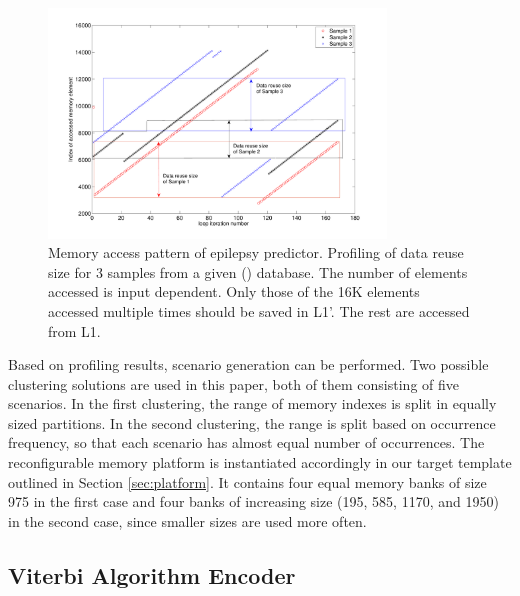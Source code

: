 \begin{figure}[!t]
\centering
\includegraphics[width=0.8\textwidth]{A/eegprof_v1-eps-converted-to.pdf}
\caption{Memory access pattern of epilepsy predictor. Profiling of data reuse size for 3 samples from a given (\cite{Iasemidis2005}) database. The number of elements accessed is input dependent. Only those of the 16K elements accessed multiple times should be saved in L1'. The rest are accessed from L1.}
\label{fig:eegprof}
\end{figure}

Based on profiling results, scenario generation can be performed. Two possible clustering solutions are used in this paper, both of them consisting of five scenarios. In the first clustering, the range of memory indexes is split in equally sized partitions.  In the second clustering, the range is split based on occurrence frequency, so that each scenario has almost equal number of occurrences. The reconfigurable memory platform is instantiated accordingly in our target template outlined in Section \ref{sec:platform}. It contains four equal memory banks of size 975 in the first case and four banks of increasing size (195, 585, 1170, and 1950) in the second case, since smaller sizes are used more often. 

\subsection{Viterbi Algorithm Encoder}


